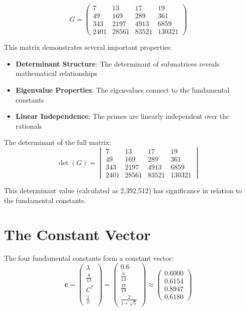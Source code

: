 \documentclass[12pt,a4paper]{report}
\newcommand{\Cstar}{C^*}
\newcommand{\base十三refined}{\frac{8}{13}}
\begin{document}
\[
G = \begin{pmatrix}
7 & 13 & 17 & 19 \\
49 & 169 & 289 & 361 \\
343 & 2197 & 4913 & 6859 \\
2401 & 28561 & 83521 & 130321
\end{pmatrix}
\]

This matrix demonstrates several important properties:

\begin{itemize}
\item \textbf{Determinant Structure}: The determinant of submatrices reveals mathematical relationships
\item \textbf{Eigenvalue Properties}: The eigenvalues connect to the fundamental constants
\item \textbf{Linear Independence}: The primes are linearly independent over the rationals
\end{itemize}

The determinant of the full matrix:
\[
\det(G) = \begin{vmatrix}
7 & 13 & 17 & 19 \\
49 & 169 & 289 & 361 \\
343 & 2197 & 4913 & 6859 \\
2401 & 28561 & 83521 & 130321
\end{vmatrix}
\]

This determinant value (calculated as 2,392,512) has significance in relation to the fundamental constants.

\section{The Constant Vector}

The four fundamental constants form a constant vector:
\[
\mathbf{c} = \begin{pmatrix}
\lambda \\
\base十三refined \\
\Cstar \\
\frac{1}{\phi}
\end{pmatrix}
=
\begin{pmatrix}
0.6 \\
\frac{8}{13} \\
\frac{17}{19} \\
\frac{2}{1+\sqrt{5}}
\end{pmatrix}
\approx
\begin{pmatrix}
0.6000 \\
0.6154 \\
0.8947 \\
0.6180
\end{pmatrix}
\]
\end{document}
